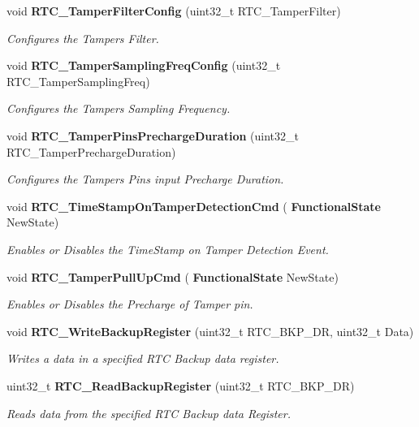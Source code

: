 \begin{DoxyCompactItemize}
void \textbf{ R\+T\+C\+\_\+\+Tamper\+Filter\+Config} (uint32\+\_\+t R\+T\+C\+\_\+\+Tamper\+Filter)
\begin{DoxyCompactList}\small\item\em Configures the Tampers Filter. \end{DoxyCompactList}\item 
void \textbf{ R\+T\+C\+\_\+\+Tamper\+Sampling\+Freq\+Config} (uint32\+\_\+t R\+T\+C\+\_\+\+Tamper\+Sampling\+Freq)
\begin{DoxyCompactList}\small\item\em Configures the Tampers Sampling Frequency. \end{DoxyCompactList}\item 
void \textbf{ R\+T\+C\+\_\+\+Tamper\+Pins\+Precharge\+Duration} (uint32\+\_\+t R\+T\+C\+\_\+\+Tamper\+Precharge\+Duration)
\begin{DoxyCompactList}\small\item\em Configures the Tampers Pins input Precharge Duration. \end{DoxyCompactList}\item 
void \textbf{ R\+T\+C\+\_\+\+Time\+Stamp\+On\+Tamper\+Detection\+Cmd} (\textbf{ Functional\+State} New\+State)
\begin{DoxyCompactList}\small\item\em Enables or Disables the Time\+Stamp on Tamper Detection Event. \end{DoxyCompactList}\item 
void \textbf{ R\+T\+C\+\_\+\+Tamper\+Pull\+Up\+Cmd} (\textbf{ Functional\+State} New\+State)
\begin{DoxyCompactList}\small\item\em Enables or Disables the Precharge of Tamper pin. \end{DoxyCompactList}\item 
void \textbf{ R\+T\+C\+\_\+\+Write\+Backup\+Register} (uint32\+\_\+t R\+T\+C\+\_\+\+B\+K\+P\+\_\+\+DR, uint32\+\_\+t Data)
\begin{DoxyCompactList}\small\item\em Writes a data in a specified R\+TC Backup data register. \end{DoxyCompactList}\item 
uint32\+\_\+t \textbf{ R\+T\+C\+\_\+\+Read\+Backup\+Register} (uint32\+\_\+t R\+T\+C\+\_\+\+B\+K\+P\+\_\+\+DR)
\begin{DoxyCompactList}\small\item\em Reads data from the specified R\+TC Backup data Register. \end{DoxyCompactList}\item 

\end{DoxyCompactItemize}
